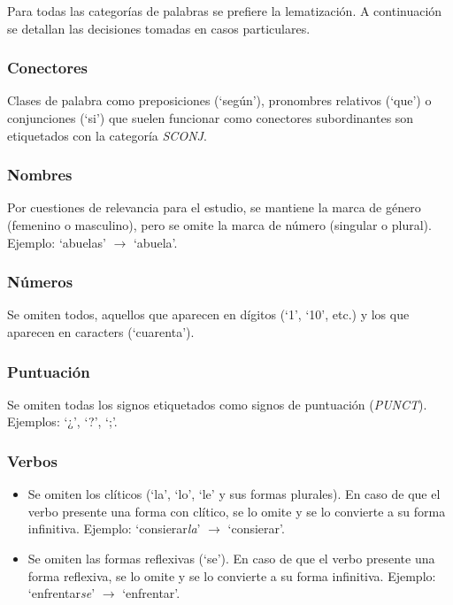 Para todas las categor\'ias de palabras se prefiere la lematizaci\'on. A continuaci\'on
se detallan las decisiones tomadas en casos particulares.

\subsubsection{Conectores}
Clases de palabra como preposiciones (`seg\'un'), pronombres relativos (`que') o
conjunciones (`si') que suelen funcionar como conectores subordinantes son
etiquetados con la categor\'ia \textit{SCONJ}.

\subsubsection{Nombres}
Por cuestiones de relevancia para el estudio, se mantiene la marca de g\'enero (femenino
o masculino), pero se omite la marca de n\'umero (singular o plural). Ejemplo: `abuelas'
$\rightarrow$ `abuela'.

\subsubsection{N\'umeros}
Se omiten todos, aquellos que aparecen en d\'igitos (`1', `10', etc.) y los que aparecen
en caracters (`cuarenta').

\subsubsection{Puntuaci\'on}
Se omiten todas los signos etiquetados como signos de puntuaci\'on (\textit{PUNCT}).
Ejemplos: `¿', `?', `;'.

\subsubsection{Verbos}
\begin{itemize}
    \item Se omiten los cl\'iticos (`la', `lo', `le' y sus formas plurales). En caso de
    que el verbo presente una forma con cl\'itico, se lo omite y se lo convierte a su
    forma infinitiva. Ejemplo: `consierar\textit{la}' $\rightarrow$ `consierar'.
    \item Se omiten las formas reflexivas (`se'). En caso de que el verbo presente
    una forma reflexiva, se lo omite y se lo convierte a su forma infinitiva.
    Ejemplo: `enfrentar\textit{se}' $\rightarrow$ `enfrentar'.
\end{itemize}

